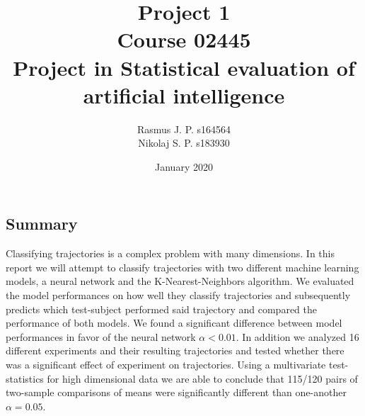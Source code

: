 \documentclass{article}
\begin{document}
\begin{titlepage}
	
	
	\title{Project 1 \\ Course 02445 \\ Project in Statistical evaluation of \\ artificial intelligence }
	\author{Rasmus J. P. s164564 \\ Nikolaj S. P. s183930}
	\date{January 2020}
	\maketitle
	
\subsection*{Summary}
Classifying trajectories is a complex problem with many dimensions. In this report we will attempt to classify trajectories with two different machine learning models, a neural network and the K-Nearest-Neighbors algorithm. We evaluated the model performances on how well they classify trajectories and subsequently predicts which test-subject performed said trajectory and compared the performance of both models. We found a significant difference between model performances in favor of the neural network $\alpha < 0.01$. In addition we analyzed 16 different experiments and their resulting trajectories and tested whether there was a significant effect of experiment on trajectories. Using a multivariate test-statistics for high dimensional data we are able to conclude that 115/120 pairs of two-sample comparisons of means were significantly different than one-another $\alpha = 0.05$.

\end{titlepage}
\end{document}
